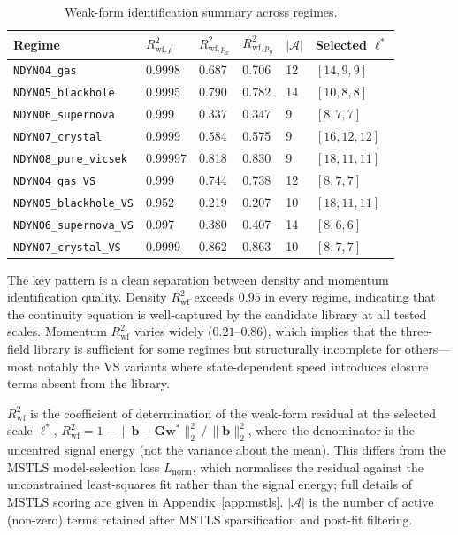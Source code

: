 \begin{table}[ht]
\centering
\caption{Weak-form identification summary across regimes.}
\label{tab:wsindy_regime_summary}
\renewcommand{\arraystretch}{0.95}
\small
\begin{tabular}{llllll}
\toprule
\textbf{Regime} & $R^2_{\text{wf},\rho}$ & $R^2_{\text{wf},p_x}$ & $R^2_{\text{wf},p_y}$ & $|\mathcal{A}|$ & Selected $\boldsymbol{\ell}^*$ \\
\midrule
\texttt{NDYN04\_gas} & 0.9998 & 0.687 & 0.706 & 12 & $[14,9,9]$ \\
\texttt{NDYN05\_blackhole} & 0.9995 & 0.790 & 0.782 & 14 & $[10,8,8]$ \\
\texttt{NDYN06\_supernova} & 0.999 & 0.337 & 0.347 & 9 & $[8,7,7]$ \\
\texttt{NDYN07\_crystal} & 0.9999 & 0.584 & 0.575 & 9 & $[16,12,12]$ \\
\texttt{NDYN08\_pure\_vicsek} & 0.99997 & 0.818 & 0.830 & 9 & $[18,11,11]$ \\
\midrule
\texttt{NDYN04\_gas\_VS} & 0.999 & 0.744 & 0.738 & 12 & $[8,7,7]$ \\
\texttt{NDYN05\_blackhole\_VS} & 0.952 & 0.219 & 0.207 & 10 & $[18,11,11]$ \\
\texttt{NDYN06\_supernova\_VS} & 0.997 & 0.380 & 0.407 & 14 & $[8,6,6]$ \\
\texttt{NDYN07\_crystal\_VS} & 0.9999 & 0.862 & 0.863 & 10 & $[8,7,7]$ \\
\bottomrule
\end{tabular}
\end{table}

\noindent
The key pattern is a clean separation between density and momentum
identification quality.  Density $R^2_{\text{wf}}$ exceeds $0.95$ in every
regime, indicating that the continuity equation is well-captured by the
candidate library at all tested scales.  Momentum $R^2_{\text{wf}}$ varies
widely ($0.21$--$0.86$), which implies that the three-field library is
sufficient for some regimes but structurally incomplete for others---most
notably the VS variants where state-dependent speed introduces closure
terms absent from the library.

$R^2_{\text{wf}}$ is the coefficient of determination of the
weak-form residual at the selected scale $\boldsymbol{\ell}^*$,
$R^2_{\mathrm{wf}} = 1 -
\lVert\mathbf{b} - \mathbf{G}\mathbf{w}^*\rVert_2^2\,/\,
\lVert\mathbf{b}\rVert_2^2$,
where the denominator is the uncentred signal energy (not the variance
about the mean).  This differs from the MSTLS model-selection loss
$L_{\mathrm{norm}}$, which normalises the residual against the
unconstrained least-squares fit rather than the signal energy;
full details of MSTLS scoring are given in Appendix~\ref{app:mstls}.
$|\mathcal{A}|$ is the number of active (non-zero) terms retained after
MSTLS sparsification and post-fit filtering.

